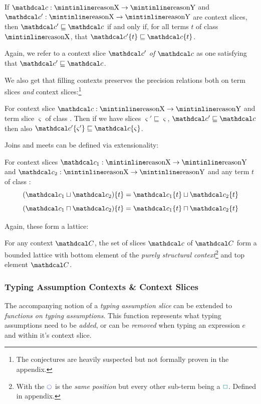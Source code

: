 \begin{definition}\label{def:ContextPrecision}
If $\Cs : \code{X} \to \code{Y}$ and $\Cs' : \code{X} \to \code{Y}$ are context slices, then $\Cs' \sqsubseteq \Cs$ if and only if, for all terms $t$ of class $\code{X}$, that $\Cs'\{t\} \sqsubseteq \Cs\{t\}$.
\end{definition}

Again, we refer to a context slice $\Cs'$ \textit{of} $\Cs$ as one satisfying that $\Cs' \sqsubseteq \Cs$.

We also get that filling contexts preserves the precision relations both on term slices \textit{and} context slices:\footnote{The conjectures are heavily suspected but not formally proven in the appendix.}
\begin{conjecture}
For context slice $\Cs : \code{X} \to \code{Y}$ and term slice $\varsigma$ of class . Then if we have slices $\varsigma' \sqsubseteq \varsigma$, $\Cs' \sqsubseteq \Cs$ then also $\Cs'\{\varsigma'\} \sqsubseteq \Cs\{\varsigma\}$.
\end{conjecture}

Joins and meets can be defined via extensionality:
\begin{definition}
For context slices $\Cs_1 : \code{X} \to \code{Y}$ and $\Cs_2 : \code{X} \to \code{Y}$ and any term $t$ of class :
\[(\Cs_1 \sqcup \Cs_2)\{t\} = \Cs_1\{t\} \sqcup \Cs_2\{t\}\]
\[(\Cs_1 \sqcap \Cs_2)\{t\} = \Cs_1\{t\} \sqcap \Cs_2\{t\}\]
\end{definition}

Again, these form a lattice:
\begin{proposition}
For any context $\C$, the set of slices $\Cs$ of $\C$ form a bounded lattice with bottom element of the \textit{purely structural context}\footnote{With the $\cmark$ is the \textit{same position} but every other sub-term being a ${\color{teal}\Box}$. Defined in appendix.} and top element $\C$.
\end{proposition}

\subsubsection{Typing Assumption Contexts \& Context Slices}
The accompanying notion of a \textit{typing assumption slice} can be extended to \textit{functions on typing assumptions}. This function represents what typing assumptions need to be \textit{added}, or can be \textit{removed} when typing an expression $e$ and within it's context slice.

